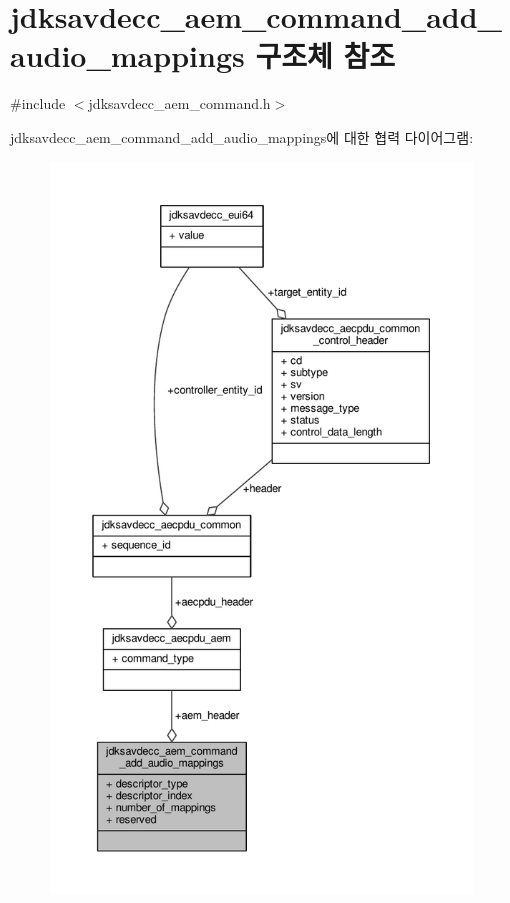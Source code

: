 \hypertarget{structjdksavdecc__aem__command__add__audio__mappings}{}\section{jdksavdecc\+\_\+aem\+\_\+command\+\_\+add\+\_\+audio\+\_\+mappings 구조체 참조}
\label{structjdksavdecc__aem__command__add__audio__mappings}


{\ttfamily \#include $<$jdksavdecc\+\_\+aem\+\_\+command.\+h$>$}



jdksavdecc\+\_\+aem\+\_\+command\+\_\+add\+\_\+audio\+\_\+mappings에 대한 협력 다이어그램\+:
\nopagebreak
\begin{figure}[H]
\begin{center}
\leavevmode
\includegraphics[height=550pt]{structjdksavdecc__aem__command__add__audio__mappings__coll__graph}
\end{center}
\end{figure}
